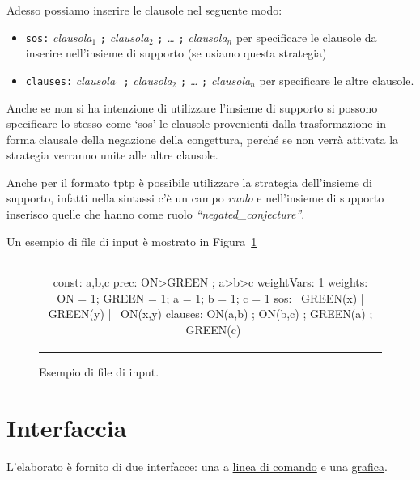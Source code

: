 \documentclass[a4paper,11pt]{article} %
\newcommand{\sintassi}{\texttt}
\newenvironment{myfigure}[2]
  {\newcommand{\didascalia}{\caption{#1}}%
   \newcommand{\etichetta}{\label{#2}}%
   \begin{figure}[h!]\centering}
  {\didascalia\etichetta\end{figure}}
\begin{document}
Adesso possiamo inserire le clausole nel seguente modo:
\vspace{-1ex}
\begin{itemize}
  \item{\sintassi{sos:} \emph{clausola$_1$} \sintassi{;} 
  \emph{clausola$_2$} \sintassi{;} \emph{\ldots} \sintassi{;} \emph{clausola$_n$}}
  per specificare le clausole da inserire nell'insieme di supporto (se usiamo questa strategia)
\vspace{-1ex}
  \item{\sintassi{clauses:} \emph{clausola$_1$} \sintassi{;} 
  \emph{clausola$_2$} \sintassi{;} \emph{\ldots} \sintassi{;} \emph{clausola$_n$}}
  per specificare le altre clausole.
\end{itemize}
\vspace{-1ex}
Anche se non si ha intenzione di utilizzare l'insieme di supporto si possono
specificare lo stesso come `sos' le clausole provenienti dalla trasformazione in
forma clausale della negazione della congettura, perché se non verrà attivata la
strategia verranno unite alle altre clausole.

Anche per il formato tptp è possibile utilizzare la strategia dell'insieme di 
supporto, infatti nella sintassi c'è un campo \emph{ruolo} e nell'insieme di
supporto inserisco quelle che hanno come ruolo \emph{``negated\_conjecture''}.

Un esempio di file di input è mostrato in Figura~\ref{fig: esempio input}
\begin{myfigure}{Esempio di file di input.}{fig: esempio input}
\begin{tabular}{c}
\begin{codice}
const: a,b,c
prec: ON>GREEN ; a>b>c
weightVars: 1
weights: ON = 1; GREEN = 1; a = 1; b = 1; c = 1
sos: ~GREEN(x) | GREEN(y) | ~ON(x,y)
clauses: ON(a,b) ; ON(b,c) ; GREEN(a) ; ~GREEN(c)
\end{codice}
\end{tabular}
\end{myfigure}


\section{Interfaccia}\label{sec: interfaccia}
L'elaborato è fornito di due interfacce: una a 
\hyperref[subsec: int. linea]{linea di comando} e una 
\hyperref[subsec: int. grafica]{grafica}.
\end{document}
